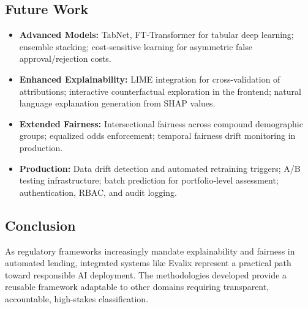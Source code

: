 \documentclass[journal]{IEEEtran}
\begin{document}
\subsection{Future Work}

\begin{itemize}[nosep]
  \item \textbf{Advanced Models:} TabNet, FT-Transformer for tabular deep learning; ensemble stacking; cost-sensitive learning for asymmetric false approval/rejection costs.
  \item \textbf{Enhanced Explainability:} LIME integration for cross-validation of attributions; interactive counterfactual exploration in the frontend; natural language explanation generation from SHAP values.
  \item \textbf{Extended Fairness:} Intersectional fairness across compound demographic groups; equalized odds enforcement; temporal fairness drift monitoring in production.
  \item \textbf{Production:} Data drift detection and automated retraining triggers; A/B testing infrastructure; batch prediction for portfolio-level assessment; authentication, RBAC, and audit logging.
\end{itemize}


\subsection{Conclusion}

As regulatory frameworks increasingly mandate explainability and fairness in automated lending, integrated systems like Evalix represent a practical path toward responsible AI deployment. The methodologies developed provide a reusable framework adaptable to other domains requiring transparent, accountable, high-stakes classification.
\end{document}
